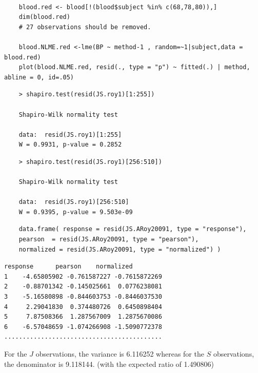 \documentclass[a4paper,12pt]{article}
\begin{document}
\begin{framed}
	\begin{verbatim}
	
	blood.red <- blood[!(blood$subject %in% c(68,78,80)),]
	dim(blood.red)
	# 27 observations should be removed.
	
	blood.NLME.red <-lme(BP ~ method-1 , random=~1|subject,data = blood.red)
	plot(blood.NLME.red, resid(., type = "p") ~ fitted(.) | method, abline = 0, id=.05)
	\end{verbatim}
\end{framed}


\begin{framed}
	\begin{verbatim}
	> shapiro.test(resid(JS.roy1)[1:255])
	
	Shapiro-Wilk normality test
	
	data:  resid(JS.roy1)[1:255]
	W = 0.9931, p-value = 0.2852
	\end{verbatim}
\end{framed}

\begin{framed}
	\begin{verbatim}
	> shapiro.test(resid(JS.roy1)[256:510])
	
	Shapiro-Wilk normality test
	
	data:  resid(JS.roy1)[256:510]
	W = 0.9395, p-value = 9.503e-09
	\end{verbatim}
\end{framed}
%		



\begin{framed}
	\begin{verbatim}
	data.frame( response = resid(JS.ARoy20091, type = "response"), 
	pearson  = resid(JS.ARoy20091, type = "pearson"), 
	normalized = resid(JS.ARoy20091, type = "normalized") )
	\end{verbatim}
\end{framed}

\begin{verbatim}
response      pearson    normalized
1    -4.65805902 -0.761587227 -0.7615872269
2    -0.88701342 -0.145025661  0.0776238081
3    -5.16580898 -0.844603753 -0.8446037530
4     2.29041830  0.374480726  0.6450898404
5     7.87508366  1.287567009  1.2875670086
6    -6.57048659 -1.074266908 -1.5090772378
...........................................
\end{verbatim}
For the $J$ observations, the variance is 6.116252 whereas for the $S$ observations, the denominator is 9.118144. (with the expected ratio of  1.490806)
\end{document}
